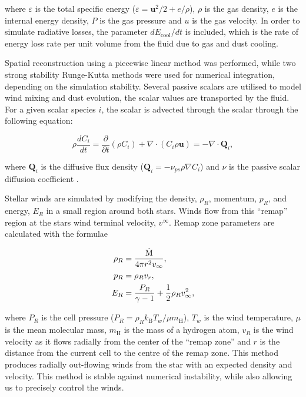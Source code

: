 \noindent
where $\varepsilon$ is the total specific energy ($\varepsilon = \boldsymbol{u}^2/2 + e/\rho $), $\rho$ is the gas density, $e$ is the internal energy density, $P$ is the gas pressure and $u$ is the gas velocity.
In order to simulate radiative losses, the parameter $dE_\text{cool}/dt$ is included, which is the rate of energy loss rate per unit volume from the fluid due to gas and dust cooling.

Spatial reconstruction using a piecewise linear method was performed, while two strong stability Runge-Kutta methods were used for numerical integration, depending on the simulation stability.
Several passive scalars are utilised to model wind mixing and dust evolution, the scalar values are transported by the fluid.
For a given scalar species $i$, the scalar is advected through the scalar through the following equation:

\begin{equation}
  \rho \frac{dC_i}{dt} = \frac{\partial}{\partial t} \left( \rho C_i \right) + \nabla \cdot \left( C_i \rho \mathbf{u} \right) = -\nabla \cdot \mathbf{Q}_i ,  
\end{equation}

\noindent
where $\mathbf{Q}_i$ is the diffusive flux density ($\mathbf{Q}_i = - \nu_{ps} \rho \nabla C_i$) and $\nu$ is the passive scalar diffusion coefficient \parencite{stoneAthenaAdaptiveMesh2020}.


Stellar winds are simulated by modifying the density, $\rho_R$, momentum, $p_R$, and energy, $E_R$ in a small region around both stars.
Winds flow from this ``remap'' region at the stars wind terminal velocity, $v^\infty$. Remap zone parameters are calculated with the formulae

\begin{subequations}
  \begin{align}
    \rho_R & = \frac{\dot{\text{M}}}{4 \pi r^2 v_\infty} , \\
    p_R    & = \rho_R v_{r} , \\
    E_R    & = \frac{P_R}{\gamma - 1} + \frac{1}{2} \rho_R v_\infty^2 ,
  \end{align}
\end{subequations}

\noindent
where $P_R$ is the cell pressure ($P_R = \rho_R k_\text{B} T_w / \mu m_\text{H}$), $T_w$ is the wind temperature, $\mu$ is the mean molecular mass, $m_\text{H}$ is the mass of a hydrogen atom, $v_R$ is the wind velocity as it flows radially from the center of the ``remap zone'' and $r$ is the distance from the current cell to the centre of the remap zone.
This method produces radially out-flowing winds from the star with an expected density and velocity.
This method is stable against numerical instability, while also allowing us to precisely control the winds.

